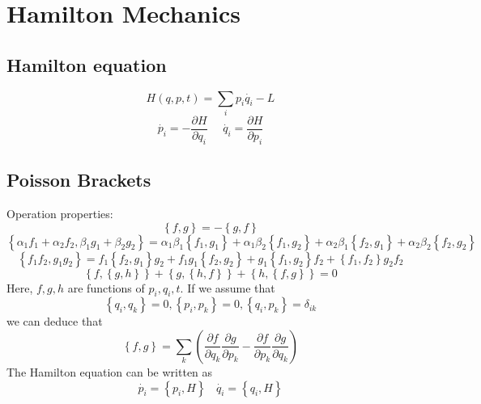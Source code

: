 \documentclass{article}
\begin{document}
\section{Hamilton Mechanics}
\subsection{Hamilton equation}
\begin{equation}
H(q,p,t)=\sum_i p_i \dot{q_i}-L
\end{equation}
\begin{equation}
\dot{p_i}=-\frac{\partial H}{\partial q_i} \ \ \ \ \ \ \dot{q_i}=\frac{\partial H}{\partial p_i}
\end{equation}
 
\subsection{Poisson Brackets}
Operation properties:
\[ \left\{f,g\right\}=-\left\{g,f\right\} \]
\[\left\{\alpha_1 f_1+\alpha_2 f_2,\beta_1 g_1+\beta_2 g_2\right\}=\alpha_1 \beta_1\left\{f_1,g_1\right\}
+\alpha_1 \beta_2\left\{f_1,g_2\right\}+\alpha_2 \beta_1\left\{f_2,g_1\right\}+\alpha_2 \beta_2\left\{f_2,g_2\right\}\]
\[\left\{f_1 f_2,g_1 g_2\right\}=f_1\left\{f_2,g_1\right\}g_2+f_1 g_1\left\{f_2,g_2\right\}+g_1\left\{f_1,g_2\right\}f_2 +\left\{f_1,f_2\right\}g_2 f_2 \]
\[\left\{f,\left\{g,h\right\}\right\}+\left\{g,\left\{h,f\right\}\right\}+\left\{h,\left\{f,g\right\}\right\}=0\]
Here, $f,g,h$ are functions of $p_i,q_i,t$.
If we assume that
\[ \left \{q_i,q_k\right \}=0,\left \{p_i,p_k\right \}=0,\left \{q_i,p_k\right \}=\delta_{ik}\]
we can deduce that 
\[ \left\{f,g\right\}=\sum_k(\frac{\partial f}{\partial q_k} \frac{\partial g}{\partial p_k} - \frac{\partial f}{\partial p_k} \frac{\partial g}{\partial q_k}  )\]
The Hamilton equation can be written as
\begin{equation}
\dot{p_i}=\left\{ p_i,H \right\} \ \ \ \ \dot{q_i}=\left\{ q_i,H \right\}
\end{equation}
\end{document}

